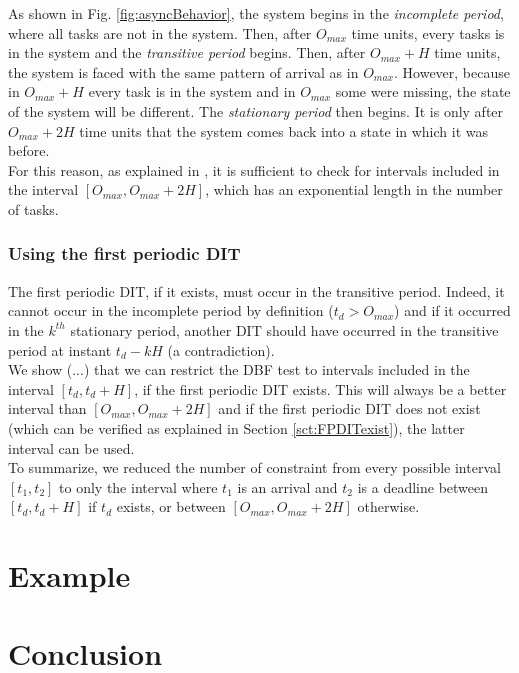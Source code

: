 \documentclass[times, 10pt,twocolumn, a4paper]{article}
\begin{document}
As shown in Fig. \ref{fig:asyncBehavior}, the system begins in the \emph{incomplete period}, where all tasks are not in the system. Then, after $O_{max}$ time units, every tasks is in the system and the \emph{transitive period} begins. Then, after $O_{max} + H$ time units, the system is faced with the same pattern of arrival as in $O_{max}$. However, because in $O_{max} + H$ every task is in the system and in $O_{max}$ some were missing, the state of the system will be different. The \emph{stationary period} then begins. It is only after $O_{max} + 2H$ time units that the system comes back into a state in which it was before.\\

For this reason, as explained in \cite{leung1982complexity}, it is sufficient to check for intervals included in the interval $[O_{max}, O_{max} + 2H]$, which has an exponential length in the number of tasks.

\subsubsection{Using the first periodic DIT}

The first periodic DIT, if it exists, must occur in the transitive period. Indeed, it cannot occur in the incomplete period by definition ($t_d > O_{max}$) and if it occurred in the $k^{th}$ stationary period, another DIT should have occurred in the transitive period at instant $t_d - k H$ (a contradiction).\\

We show (...) that we can restrict the DBF test to intervals included in the interval $[t_d, t_d + H]$, if the first periodic DIT exists. This will always be a better interval than $[O_{max}, O_{max} + 2H]$ and if the first periodic DIT does not exist (which can be verified as explained in Section \ref{sct:FPDITexist}), the latter interval can be used.\\

To summarize, we reduced the number of constraint from every possible interval $[t_1, t_2]$ to only the interval where $t_1$ is an arrival and $t_2$ is a deadline between $[t_d, t_d + H]$ if $t_d$ exists, or between $[O_{max}, O_{max} + 2H]$ otherwise.

\section{Example}

\section{Conclusion}



\end{document}
